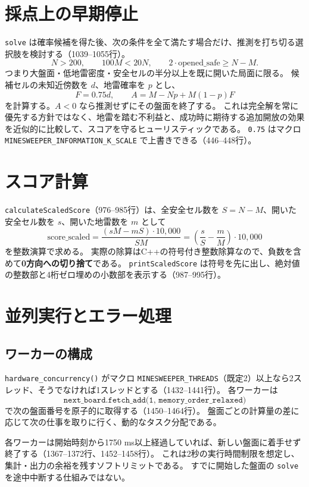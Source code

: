 \documentclass[uplatex,dvipdfmx,11pt]{jsarticle}
\newcommand{\code}[1]{\texttt{#1}}
\begin{document}
\section{採点上の早期停止}
\code{solve} は確率候補を得た後、次の条件を全て満たす場合だけ、推測を打ち切る選択肢を検討する（1039--1055行）。
\[
  N>200,\qquad 100M<20N,\qquad
  2\cdot\mathrm{opened\_safe}\ge N-M.
\]
つまり大盤面・低地雷密度・安全セルの半分以上を既に開いた局面に限る。
候補セルの未知近傍数を $d$、地雷確率を $p$ とし、
\[
  F=0.75d,\qquad
  A=M-Np+M(1-p)F
\]
を計算する。$A<0$ なら推測せずにその盤面を終了する。
これは完全解を常に優先する方針ではなく、地雷を踏む不利益と、成功時に期待する追加開放の効果を近似的に比較して、スコアを守るヒューリスティックである。
\code{0.75} はマクロ \code{MINESWEEPER\_INFORMATION\_K\_SCALE} で上書きできる（446--448行）。

\section{スコア計算}
\code{calculateScaledScore}（976--985行）は、全安全セル数を $S=N-M$、開いた安全セル数を $s$、開いた地雷数を $m$ として
\[
  \mathrm{score\_scaled}
  =
  \frac{(sM-mS)\cdot10{,}000}{SM}
  =
  \left(\frac{s}{S}-\frac{m}{M}\right)\cdot10{,}000
\]
を整数演算で求める。
実際の除算はC++の符号付き整数除算なので、負数を含めて\textbf{0方向への切り捨て}である。
\code{printScaledScore} は符号を先に出し、絶対値の整数部と4桁ゼロ埋めの小数部を表示する（987--995行）。

\section{並列実行とエラー処理}

\subsection{ワーカーの構成}
\code{hardware\_concurrency()} がマクロ \code{MINESWEEPER\_THREADS}（既定2）以上なら2スレッド、そうでなければ1スレッドとする（1432--1441行）。
各ワーカーは
\[
  \code{next\_board.fetch\_add(1, memory\_order\_relaxed)}
\]
で次の盤面番号を原子的に取得する（1450--1464行）。
盤面ごとの計算量の差に応じて次の仕事を取りに行く、動的なタスク分配である。

各ワーカーは開始時刻から1750 ms以上経過していれば、新しい盤面に着手せず終了する（1367--1372行、1452--1458行）。
これは2秒の実行時間制限を想定し、集計・出力の余裕を残すソフトリミットである。
すでに開始した盤面の \code{solve} を途中中断する仕組みではない。
\end{document}

